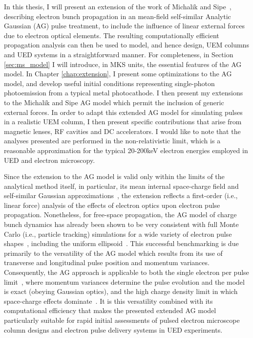 In this thesis, I will present an extension of the work of Michalik and Sipe~\cite{michalik_analytic_2006,michalik_erratum:_2008}, describing electron bunch propagation in an mean-field self-similar Analytic Gaussian (AG) pulse treatment, to include the influence of linear external forces due to electron optical elements.
The resulting computationally efficient propagation analysis can then be used to model, and hence design, UEM columns and UED systems in a straightforward manner.
For completeness, in Section \ref{sec:ms_model} I will introduce, in MKS units, the essential features of the AG model.
In Chapter \ref{chap:extension}, I present some optimizations to the AG model, and develop useful initial conditions representing single-photon photoemission from a typical metal photocathode.
I then present my extensions to the Michalik and Sipe AG model which permit the inclusion of generic external forces.
In order to adapt this extended AG model for simulating pulses in a realistic UEM column, I then present specific contributions that arise from magnetic lenses, RF cavities and DC accelerators.
I would like to note that the analyses presented are performed in the non-relativistic limit, which is a reasonable approximation for the typical 20-200keV electron energies employed in UED and electron microscopy.

Since the extension to the AG model is valid only within the limits of the analytical method itself, in particular, its mean internal space-charge field and self-similar Gaussian approximations~\cite{michalik_analytic_2006}, the extension reflects a first-order (i.e., linear force) analysis of the effects of electron optics upon electron pulse propagation.
Nonetheless, for free-space propagation, the AG model of charge bunch dynamics has already been shown to be very consistent with full Monte Carlo (i.e., particle tracking) simulations for a wide variety of electron pulse shapes~\cite{michalik_analytic_2006,michalik_evolution_2009}, including the uniform ellipsoid~\cite{luiten_how_2004}.
This successful benchmarking is due primarily to the versatility of the AG model which results from its use of transverse and longitudinal pulse position and momentum variances.
Consequently, the AG approach is applicable to both the single electron per pulse limit~\cite{lobastov_four-dimensional_2005}, where momentum variances determine the pulse evolution and the model is exact (obeying Gaussian optics), and the high charge density limit in which space-charge effects dominate~\cite{luiten_how_2004,siwick_ultrafast_2002,cao_femtosecond_2003}.
It is this versatility combined with its computational efficiency that makes the presented extended AG model particularly suitable for rapid initial assessments of pulsed electron microscope column designs and electron pulse delivery systems in UED experiments.

